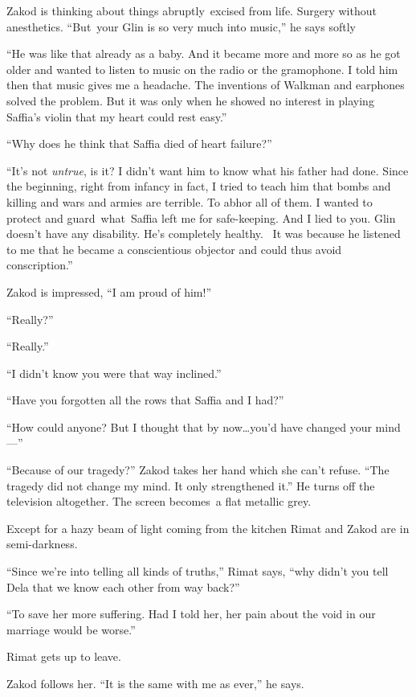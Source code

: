 \documentclass[twoside,11pt]{book}
\begin{document}
Zakod is thinking about things abruptly~excised from life. Surgery without anesthetics. ``But~your Glin is
so very much into music,'' he says softly

``He was like that already as a baby. And it became more and more so as he got older and wanted to listen
to music on the radio or the gramophone. I told him then that music gives me a headache. The inventions of Walkman and
earphones solved the problem. But it was only when he showed no interest in playing Saffia's violin that my heart
could rest easy.''

``Why does he think that Saffia died of heart failure?''

``It's not\textit{ untrue}, is it? I didn't want him to know what his father had done. Since the beginning,
right from infancy in fact, I tried to teach him that bombs and killing and wars and armies are terrible. To abhor all
of them. I wanted to protect and guard~what~Saffia left me for safe-keeping. And I lied to you. Glin doesn't have any
disability. He's completely healthy. ~It was because he listened to me that he became a conscientious objector and
could thus avoid conscription.''

Zakod is impressed, ``I am proud of him!''

``Really?''

``Really.''

``I didn't know you were that way inclined.''

``Have you forgotten all the rows that Saffia and I had?''

``How could anyone?  But I thought that by now{\ldots}you'd have changed your mind ---''

``Because of our tragedy?'' Zakod takes her hand which she can't refuse. ``The
tragedy did not change my mind. It only strengthened it.'' He turns off the television altogether. The
screen becomes~a flat metallic grey.

Except for a hazy beam of light coming{ }from the kitchen Rimat and
Zakod are in semi-darkness.

``Since we're into telling all kinds of truths,'' Rimat says, ``why didn't you
tell Dela that we know each other from way back?''

``To save her more suffering. Had I told her, her pain about the void in our marriage would be
worse.''

Rimat gets up to leave.

Zakod follows her. ``It is the same with me as ever,'' he says.
\end{document}
